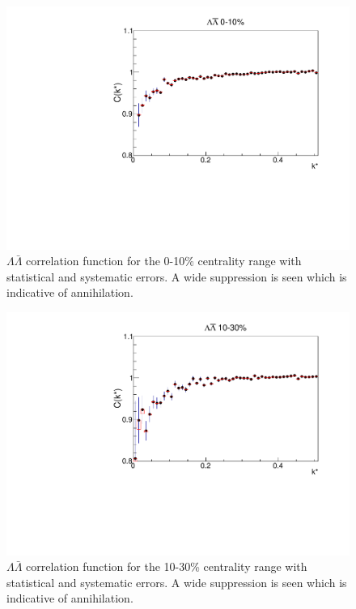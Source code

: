 \begin{figure}[hbtp]
\includegraphics[width=36pc]{Figures/CFs/2016-8-30-CFLamALam010CombinedSystematicsMaximum.pdf}
\caption[$\Lambda\bar{\Lambda}$ correlation function for the 0-10\% centrality range]{$\Lambda\bar{\Lambda}$ correlation function for the 0-10\% centrality range with statistical and systematic errors.  
A wide suppression is seen which is indicative of annihilation.}
\label{fig:CFLamALam010}
\end{figure}
\begin{figure}[hbtp]
\includegraphics[width=36pc]{Figures/CFs/2016-8-30-CFLamALam1030CombinedSystematicsMaximum.pdf}
\caption[$\Lambda\bar{\Lambda}$ correlation function for the 10-30\% centrality range]{$\Lambda\bar{\Lambda}$ correlation function for the 10-30\% centrality range with statistical and systematic errors.  
A wide suppression is seen which is indicative of annihilation.}
\label{fig:CFLamALam1030}
\end{figure}
